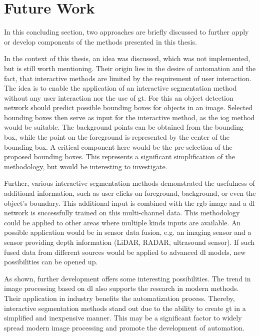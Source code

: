 
\section{Future Work}

In this concluding section, two approaches are briefly discussed to further apply or develop components of the methods presented in this thesis.

In the context of this thesis, an idea was discussed, which was not implemented, but is still worth mentioning.
Their origin lies in the desire of automation and the fact, that interactive methods are limited by the requirement of user interaction. 
The idea is to enable the application of an interactive segmentation method without any user interaction nor the use of \gls{gt}.
For this an object detection network should predict possible bounding boxes for objects in an image.
Selected bounding boxes then serve as input for the interactive method, as the \gls{iog} method would be suitable.
The background points can be obtained from the bounding box, while the point on the foreground is represented by the center of the bounding box.
A critical component here would be the pre-selection of the proposed bounding boxes.
This represents a significant simplification of the methodology, but would be interesting to  investigate.

Further, various interactive segmentation methods \cite{Xu16-InteractiveObjectSelection}  \cite{MVL18-ITIS} \cite{Man18-DEXTR} \cite{Zha20-IOG} demonstrated the usefulness of additional information, such as user clicks on foreground, background, or even the object's boundary.
This additional input is combined with the \gls{rgb} image and a \gls{dl} network is successfully trained on this multi-channel data.
This methodology could be applied to other areas where multiple kinds inputs are available.
An possible application would be in sensor data fusion, e.g. an imaging sensor and a sensor providing depth information (LiDAR, RADAR, ultrasound sensor).
If such fused data from different sources would be applied to advanced \gls{dl} models, new possibilities can be opened up.

As shown, further development offers some interesting possibilities.
The trend in image processing based on \gls{dl} also supports the research in modern methods.
Their application in industry benefits the automatization process.
Thereby, interactive segmentation methods stand out due to the ability to create \gls{gt} in a simplified and inexpensive manner.
This may be a significant factor to widely spread modern image processing and promote the development of automation.
